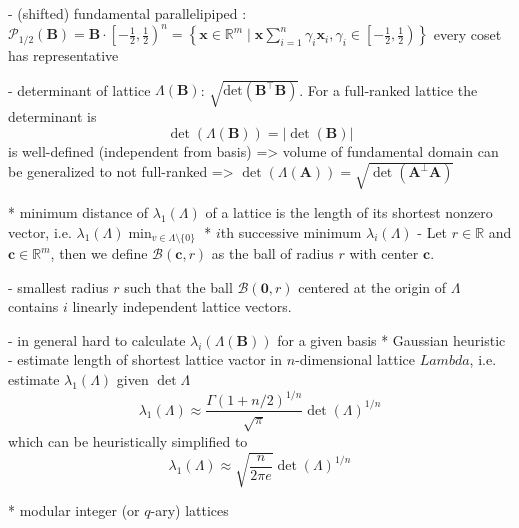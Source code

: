 \documentclass[
  a4paper,  %
  twoside,  %
  bibliography=totoc,
  headsepline,
  cleardoublepage=empty,
  parskip=half,
  draft=false
]{scrbook}
\begin{document}
- (shifted) fundamental parallelipiped \label{eq:fundamental-parallelipiped}: $\mathcal{P}_{1/2}(\mathbf{B}) = \mathbf{B} \cdot \left[ - \frac{1}{2}, \frac{1}{2}\right)^n = \left\{ \mathbf{x} \in \mathbb{R}^m \mid \mathbf{x} \sum_{i=1}^n \gamma_i \mathbf{x}_i, \gamma_i \in  \left[ - \frac{1}{2}, \frac{1}{2}\right) \right\}$ every coset has representative  %

- determinant of lattice $\Lambda(\mathbf{B})$: $\sqrt{\text{det}\left(\mathbf{B}^\intercal \mathbf{B}\right)}$. For a full-ranked lattice the determinant is
\begin{equation}
  \det(\Lambda(\mathbf{B})) = |\det(\mathbf{B})|
\end{equation}
is well-defined (independent from basis) => volume of fundamental domain %
can be generalized to not full-ranked => $\det(\Lambda(\mathbf{A})) = \sqrt{\det(\mathbf{A}^\perp \mathbf{A})}$ %

* minimum distance of $\lambda_1(\Lambda)$ of a lattice is the length of its shortest nonzero vector, i.e. $\lambda_1(\Lambda) \min_{v \in \Lambda \setminus \{0\}}$
* $i$th successive minimum $\lambda_i(\Lambda)$
- Let $r\in \mathbb{R}$ and $\mathbf{c} \in \mathbb{R}^m$, then we define $\mathcal{B}(\mathbf{c}, r)$ as the ball of radius $r$ with center $\mathbf{c}$.

- smallest radius $r$ such that the ball $\mathcal{B}(\mathbf{0}, r)$ centered at the origin of $\Lambda$ contains $i$ linearly independent lattice vectors.

- in general hard to calculate $\lambda_i(\Lambda(\mathbf{B}))$ for a given basis
* Gaussian heuristic \cite{Gop16}
- estimate length of shortest lattice vactor in $n$-dimensional lattice $Lambda$, i.e. estimate $\lambda_1(\Lambda)$ given $\det{\Lambda}$
\begin{equation}\label{eq:gaussian-heuristic}
  \lambda_1(\Lambda) \approx \frac{\Gamma(1 + n/2)^{1/n}}{\sqrt{\pi}} \det(\Lambda)^{1/n}
\end{equation}
which can be heuristically simplified to
\begin{equation}\label{eq:simplified-gaussian-heuristic}
  \lambda_1(\Lambda) \approx \sqrt{\frac{n}{2\pi e}} \det(\Lambda)^{1/n}
\end{equation}



* modular integer (or $q$-ary) lattices %
\end{document}
